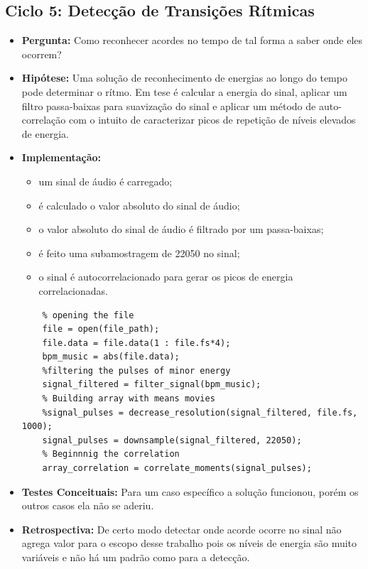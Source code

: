 \subsection{Ciclo 5: Detecção de Transições Rítmicas}
\label{subsec:ciclo_5}
\begin{itemize}
\item \textbf{Pergunta:} Como reconhecer acordes no tempo de tal forma a saber onde eles ocorrem?
\item \textbf{Hipótese:} Uma solução de reconhecimento de energias ao longo do tempo pode determinar o rítmo. Em tese é calcular a energia do sinal, aplicar
um filtro passa-baixas para suavização do sinal e aplicar um método de auto-correlação com o intuito de caracterizar picos de repetição de níveis elevados de energia.
\item \textbf{Implementação:} 
\begin{itemize} 
	\item um sinal de áudio é carregado;
	\item é calculado o valor absoluto do sinal de áudio;
	\item o valor absoluto do sinal de áudio é filtrado por um passa-baixas;
	\item é feito uma subamostragem de 22050 no sinal;
	\item o sinal é autocorrelacionado para gerar os picos de energia correlacionadas.
\end{itemize}
\begin{lstlisting}
    % opening the file
    file = open(file_path);
    file.data = file.data(1 : file.fs*4);
    bpm_music = abs(file.data);
    %filtering the pulses of minor energy
    signal_filtered = filter_signal(bpm_music);
    % Building array with means movies
    %signal_pulses = decrease_resolution(signal_filtered, file.fs, 1000);
    signal_pulses = downsample(signal_filtered, 22050);
    % Beginnnig the correlation
    array_correlation = correlate_moments(signal_pulses);

\end{lstlisting}
\item \textbf{Testes Conceituais:} Para um caso específico a solução funcionou, porém os outros casos ela não se aderiu.    
\item \textbf{Retrospectiva:} De certo modo detectar onde acorde ocorre no sinal não agrega valor para o escopo desse trabalho pois os níveis de energia são muito variáveis e não há um padrão como para a detecção.
\end{itemize} 

